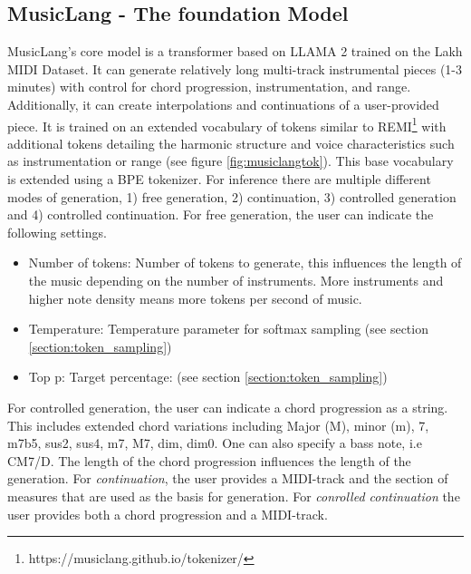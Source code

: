 \subsection{MusicLang - The foundation Model}
MusicLang's core model is a transformer based on LLAMA 2 trained on the Lakh MIDI Dataset\cite{Raffel_2016}. It can generate relatively long multi-track instrumental pieces (1-3 minutes) with control for chord progression, instrumentation, and range. Additionally, it can create interpolations and continuations of a user-provided piece. It is trained on an extended vocabulary of tokens similar to REMI\footnote{https://musiclang.github.io/tokenizer/} with additional tokens detailing the harmonic structure and voice characteristics such as instrumentation or range (see figure \ref{fig:musiclangtok}). This base vocabulary is extended using a BPE tokenizer. 
 For inference there are multiple different modes of generation, 1) free generation, 2) continuation, 3) controlled generation and 4) controlled continuation. For free generation, the user can indicate the following settings.
\begin{itemize}
    \item Number of tokens: Number of tokens to generate, this influences the length of the music depending on the number of instruments. More instruments and higher note density means more tokens per second of music.
    \item Temperature: Temperature parameter for softmax sampling (see section \ref{section:token_sampling})
    \item  Top p: Target percentage: (see section \ref{section:token_sampling}) 
\end{itemize}
For controlled generation, the user can indicate a chord progression as a string. This includes extended chord variations including Major (M), minor (m), 7, m7b5, sus2, sus4, m7, M7, dim, dim0. One can also specify a bass note, i.e CM7/D. The length of the chord progression influences the length of the generation.
For \textit{continuation}, the user provides a MIDI-track and the section of measures that are used as the basis for generation.
For \textit{conrolled continuation} the user provides both a chord progression and a MIDI-track. 

